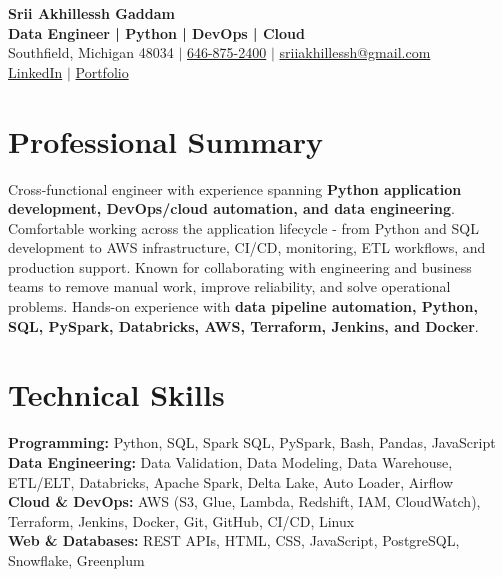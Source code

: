 \documentclass[letterpaper,10pt]{article}
\begin{document}
\fontsize{9.35pt}{10.45pt}\selectfont

\begin{center}
    {\LARGE \textbf{Srii Akhillessh Gaddam}} \\[-1pt]
    \textbf{Data Engineer | Python | DevOps | Cloud} \\[2pt]
    Southfield, Michigan 48034 $|$
    \href{tel:6468752400}{646-875-2400} $|$
    \href{mailto:sriiakhillessh@gmail.com}{sriiakhillessh@gmail.com} \\[1pt]
    \href{https://www.linkedin.com/in/srii-akhiilessh-gaddam-b48668191/}{LinkedIn} $|$
    \href{https://sriiakhillesshg.github.io/portfolio/}{Portfolio}
\end{center}
\vspace{-8pt}

\section{Professional Summary}
\small{Cross-functional engineer with experience spanning \textbf{Python application development, DevOps/cloud automation, and data engineering}. Comfortable working across the application lifecycle - from Python and SQL development to AWS infrastructure, CI/CD, monitoring, ETL workflows, and production support. Known for collaborating with engineering and business teams to remove manual work, improve reliability, and solve operational problems. Hands-on experience with \textbf{data pipeline automation, Python, SQL, PySpark, Databricks, AWS, Terraform, Jenkins, and Docker}.}

\section{Technical Skills}
\small{
\textbf{Programming:} Python, SQL, Spark SQL, PySpark, Bash, Pandas, JavaScript \\
\textbf{Data Engineering:} Data Validation, Data Modeling, Data Warehouse, ETL/ELT, Databricks, Apache Spark, Delta Lake, Auto Loader, Airflow \\
\textbf{Cloud \& DevOps:} AWS (S3, Glue, Lambda, Redshift, IAM, CloudWatch), Terraform, Jenkins, Docker, Git, GitHub, CI/CD, Linux \\
\textbf{Web \& Databases:} REST APIs, HTML, CSS, JavaScript, PostgreSQL, Snowflake, Greenplum
}
\end{document}
